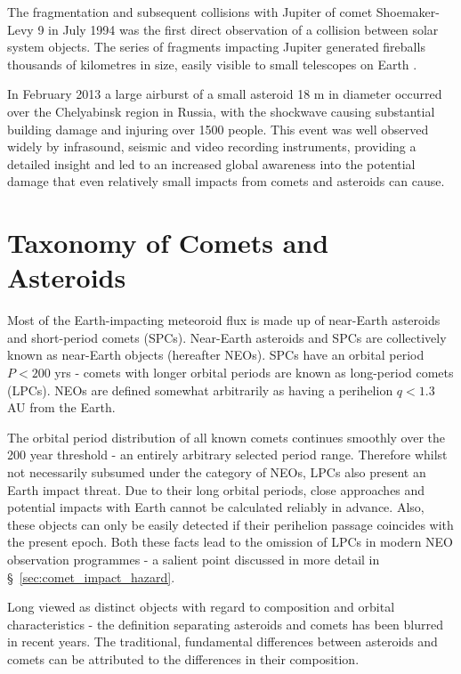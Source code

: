 The fragmentation and subsequent collisions with Jupiter of comet Shoemaker-Levy 9 in July 1994 was the first direct observation of a collision between solar system objects. The series of fragments impacting Jupiter generated fireballs thousands of kilometres in size, easily visible to small telescopes on Earth \cite{2004jpsm.book..159H}. 

In February 2013 a large airburst of a small asteroid 18 m in diameter \cite{2013Natur.503..238B} occurred over the Chelyabinsk region in Russia, with the shockwave causing substantial building damage and injuring over 1500 people. This event was well observed widely by infrasound, seismic and video recording instruments, providing a detailed insight and led to an increased global awareness into the potential damage that even relatively small impacts from comets and asteroids can cause.   

\section{Taxonomy of Comets and Asteroids}

Most of the Earth-impacting meteoroid flux is made up of near-Earth asteroids and short-period comets (SPCs). Near-Earth asteroids and SPCs are collectively known as near-Earth objects (hereafter NEOs). SPCs have an orbital period $P < 200$ yrs - comets with longer orbital periods are known as long-period comets (LPCs). NEOs are defined somewhat arbitrarily as having a perihelion $q < 1.3$ AU from the Earth.

The orbital period distribution of all known comets continues smoothly over the 200 year threshold - an entirely arbitrary selected period range. Therefore whilst not necessarily subsumed under the category of NEOs, LPCs also present an Earth impact  threat. Due to their long orbital periods, close approaches and potential impacts with Earth cannot be calculated reliably in advance. Also, these objects can only be easily detected if their perihelion passage coincides with the present epoch. Both these facts lead to the omission of LPCs in modern NEO observation programmes - a salient point discussed in more detail in \S~\ref{sec:comet_impact_hazard}.

Long viewed as distinct objects with regard to composition and orbital characteristics - the definition separating asteroids and comets has been blurred in recent years. The traditional, fundamental differences between asteroids and comets can be attributed to the differences in their composition.

